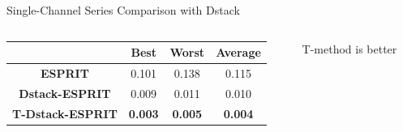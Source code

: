 \documentclass[pdf, unicode, ucs, notheorems]{beamer}
\newcommand{\bluetext}[1]{{\usebeamercolor[fg]{bluetext_color}#1}}
\theoremstyle{definition}
\begin{document}
\begin{frame}{Single-Channel Series Comparison with Dstack}
  \begin{columns}
    \begin{column}{0.7\textwidth}
      \begin{table}[ht]
        \centering
        \begin{tabular}{c|ccc}
          \hline
          & Best & Worst & Average \\
          \hline
          \textbf{ESPRIT} & 0.101 & 0.138 & 0.115 \\
          \textbf{Dstack-ESPRIT} & 0.009 & 0.011 & 0.010 \\
          \textbf{T-Dstack-ESPRIT} & \textbf{\bluetext{0.003}} &
          \textbf{\bluetext{0.005}} &
          \textbf{\bluetext{0.004}} \\
          \hline
        \end{tabular}
      \end{table}
    \end{column}
    \begin{column}{0.3\textwidth}
      T-method is better
    \end{column}
  \end{columns}

\end{frame}
\end{document}
